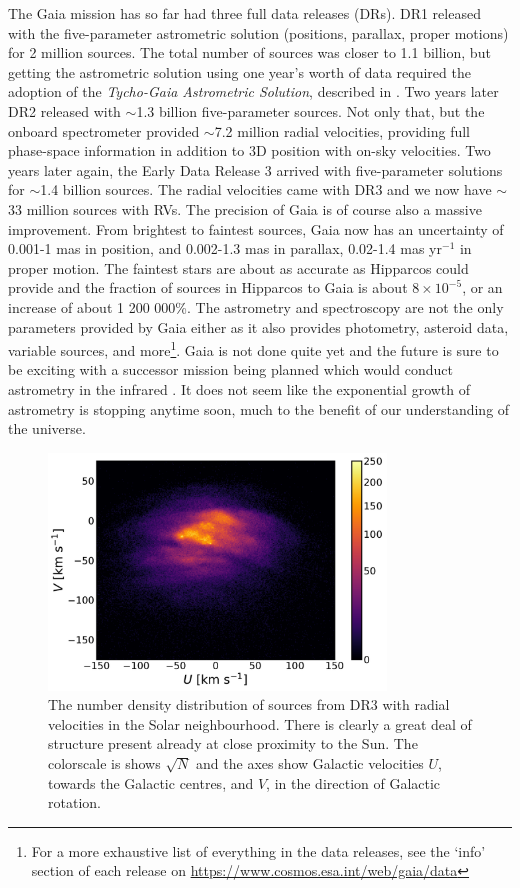 The Gaia mission has so far had three full data releases (DRs). DR1 \citep{dr1} released with the five-parameter astrometric solution (positions, parallax, proper motions) for 2 million sources. The total number of sources was closer to 1.1 billion, but getting the astrometric solution using one year's worth of data required the adoption of the \textit{Tycho-Gaia Astrometric Solution}, described in \cite{michalik:15}. Two years later DR2 \citep{dr2} released with {$\sim$}1.3 billion five-parameter sources. Not only that, but the onboard spectrometer provided {$\sim$}7.2 million radial velocities, providing full phase-space information in addition to 3D position with on-sky velocities. Two years later again, the Early Data Release 3 \citep{edr3} arrived with five-parameter solutions for {$\sim$}1.4 billion sources. The radial velocities came with DR3 \citep{dr3} and we now have {$\sim$}33 million sources with RVs. The precision of Gaia is of course also a massive improvement. From brightest to faintest sources, Gaia now has an uncertainty of 0.001-1 mas in position, and 0.002-1.3 mas in parallax, 0.02-1.4 mas yr$^{-1}$ in proper motion. The faintest stars are about as accurate as Hipparcos could provide and the fraction of sources in Hipparcos to Gaia is about $8\times 10^{-5}$, or an increase of about 1 200 000\%. The astrometry and spectroscopy are not the only parameters provided by Gaia either as it also provides photometry, asteroid data, variable sources, and more\footnote{For a more exhaustive list of everything in the data releases, see the `info' section of each release on \url{https://www.cosmos.esa.int/web/gaia/data}}. Gaia is not done quite yet and the future is sure to be exciting with a successor mission being planned which would conduct astrometry in the infrared \cite{gaiaNIR}. It does not seem like the exponential growth of astrometry is stopping anytime soon, much to the benefit of our understanding of the universe.
\begin{figure}[t]
    \centering
    \includegraphics[width=0.8\textwidth]{images/dr3veldist.pdf}
    \caption{The number density distribution of sources from DR3 with radial velocities in the Solar neighbourhood. There is clearly a great deal of structure present already at close proximity to the Sun. The colorscale is shows $\sqrt{N}$ and the axes show Galactic velocities $U$, towards the Galactic centres, and $V$, in the direction of Galactic rotation.} %
    \label{fig:veldist}
\end{figure}

